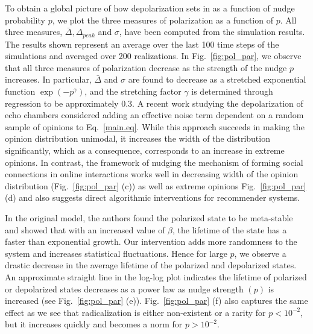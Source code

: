 To obtain a global picture of how depolarization sets in as a function of nudge probability $p$, we plot the three measures of polarization as a function of $p$. All three measures, $\bar\Delta, \Delta_{peak}$ and $\sigma$, have been computed from the simulation results. The results shown represent an average over the last 100 time steps of the simulations and averaged over 200 realizations. In Fig.~\ref{fig:pol_par}, we observe that all three measures of polarization decrease as the strength of the nudge $p$ increases. In particular, $\bar \Delta$ and $\sigma$ are found to decrease as a stretched exponential function $\exp(-p^\gamma)$, and the stretching factor $\gamma$ is determined through regression to be approximately $0.3$. A recent work studying the depolarization of echo chambers \cite{depolarization-of-echo-chambers-by-random-dynamical-nudge} considered adding an effective noise term dependent on a random sample of opinions to Eq.~\eqref{main.eq}. While this approach succeeds in making the opinion distribution unimodal, it increases the width of the distribution significantly, which as a consequence, corresponds to an increase in extreme opinions. In contrast, the framework of nudging the mechanism of forming social connections in online interactions works well in decreasing width of the opinion distribution (Fig.~\ref{fig:pol_par} (c)) as well as extreme opinions Fig.~\ref{fig:pol_par} (d) and also suggests direct algorithmic interventions for recommender systems.

In the original model, the authors found the polarized state to be meta-stable and showed that with an increased value of $\beta$, the lifetime of the state has a faster than exponential growth. Our intervention adds more randomness to the system and increases statistical fluctuations. Hence for large $p$, we observe a drastic decrease in the average lifetime of the polarized and depolarized states. An approximate straight line in the log-log plot indicates the lifetime of polarized or depolarized states decreases as a power law as nudge strength $(p)$ is increased (see Fig.~\ref{fig:pol_par} (e)). Fig.~\ref{fig:pol_par} (f) also captures the same effect as we see that radicalization is either non-existent or a rarity for $p < 10^{-2}$, but it increases quickly and becomes a norm for $p > 10^{-2}$.

